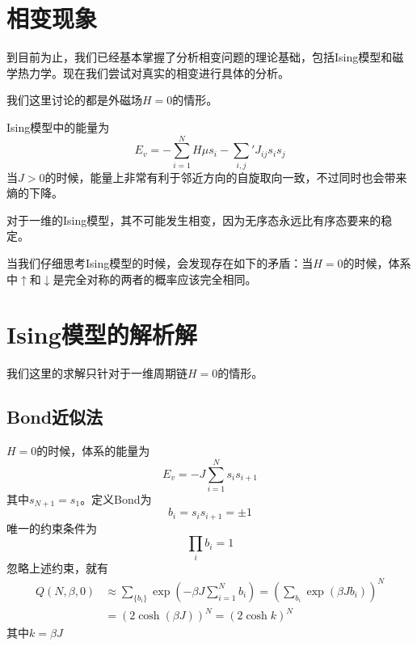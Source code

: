 \documentclass[AutoFakeBold]{tstextbook}
\begin{document}
\section{相变现象} %
\label{sec:相变现象}
到目前为止，我们已经基本掌握了分析相变问题的理论基础，包括Ising模型和磁学热力学。现在我们尝试对真实的相变进行具体的分析。

\begin{remark}
    我们这里讨论的都是外磁场$H=0$的情形。
\end{remark}

Ising模型中的能量为\begin{equation}
    E_v=-\sum_{i=1}^{N}H\mu s_i -\sum_{i,j}' J_{ij}s_is_j
\end{equation}
当$J>0$的时候，能量上非常有利于邻近方向的自旋取向一致，不过同时也会带来熵的下降。

对于一维的Ising模型，其不可能发生相变，因为无序态永远比有序态要来的稳定。

当我们仔细思考Ising模型的时候，会发现存在如下的矛盾：当$H=0$的时候，体系中$\uparrow$和$\downarrow$是完全对称的两者的概率应该完全相同。
\section{Ising模型的解析解} %
\label{sec:Ising模型的解析解}
我们这里的求解只针对于一维周期链$H=0$的情形。
\subsection{Bond近似法} %
\label{sub:Bond近似法}
$H=0$的时候，体系的能量为\begin{equation}
    E_v =-J \sum_{i=1}^{N} s_i s_{i+1}
\end{equation}
其中$s_{N+1}=s_1$。定义Bond为\begin{equation}
    b_i =s_i s_{i+1} =\pm 1
\end{equation}
唯一的约束条件为\begin{equation}
    \prod_i b_i =1
\end{equation}
忽略上述约束，就有\begin{equation}
    \begin{aligned}
        Q(N,\beta,0) &\approx \sum_{\{b_i\}} \exp({-\beta J\sum_{i=1}^{N} b_i})=\left(\sum_{b_i} \exp(\beta J b_i)\right)^N\\
        &= \left(2\cosh(\beta J)\right)^N=\left(2\cosh k\right)^N
    \end{aligned}
\end{equation}
其中$k=\beta J$
\end{document}

